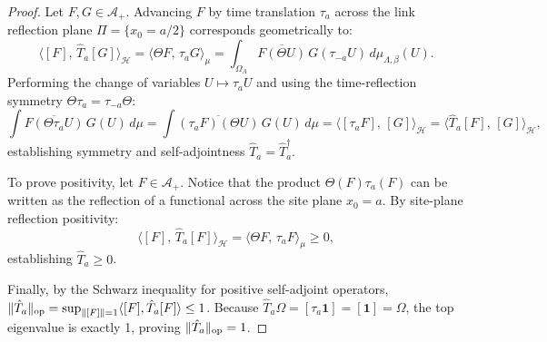 \begin{proof}
Let $F, G \in \mathcal{A}_+$. Advancing $F$ by time translation $\tau_a$ across the link reflection plane $\Pi = \{x_0 = a/2\}$ corresponds geometrically to:
\begin{equation}
\langle [F], \, \hat{T}_a [G] \rangle_{\mathcal{H}} = \langle \Theta F, \, \tau_a G \rangle_{\mu} = \int_{\Omega_\Lambda} \overline{F(\Theta U)} \, G(\tau_{-a} U) \, d\mu_{\Lambda, \beta}(U).
\end{equation}
Performing the change of variables $U \mapsto \tau_a U$ and using the time-reflection symmetry $\Theta \tau_a = \tau_{-a} \Theta$:
\begin{equation}
\int \overline{F(\Theta \tau_a U)} \, G(U) \, d\mu = \int \overline{(\tau_a F)(\Theta U)} \, G(U) \, d\mu = \langle [\tau_a F], \, [G] \rangle_{\mathcal{H}} = \langle \hat{T}_a [F], \, [G] \rangle_{\mathcal{H}},
\end{equation}
establishing symmetry and self-adjointness $\hat{T}_a = \hat{T}_a^\dagger$.

To prove positivity, let $F \in \mathcal{A}_+$. Notice that the product $\Theta(F) \tau_a(F)$ can be written as the reflection of a functional across the site plane $x_0 = a$. By site-plane reflection positivity:
\begin{equation}
\langle [F], \, \hat{T}_a [F] \rangle_{\mathcal{H}} = \langle \Theta F, \, \tau_a F \rangle_{\mu} \ge 0,
\end{equation}
establishing $\hat{T}_a \ge 0$.

Finally, by the Schwarz inequality for positive self-adjoint operators, $\|\hat{T}_a\|_{\mathrm{op}} = \sup_{\|[F]\|=1} \langle [F], \hat{T}_a [F] \rangle \le 1$. Because $\hat{T}_a \Omega = [\tau_a \mathbf{1}] = [\mathbf{1}] = \Omega$, the top eigenvalue is exactly 1, proving $\|\hat{T}_a\|_{\mathrm{op}} = 1$.
\end{proof}

